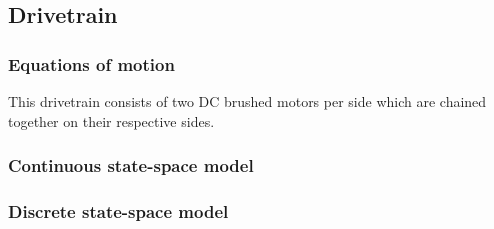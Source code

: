 \subsection{Drivetrain}

\subsubsection{Equations of motion}

This drivetrain consists of two DC brushed motors per side which are chained
together on their respective sides.

\subsubsection{Continuous state-space model}

\subsubsection{Discrete state-space model}
